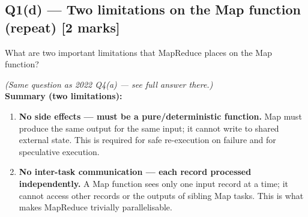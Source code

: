 \documentclass[12pt, a4paper]{article}
\newenvironment{qbox}{\begin{mdframed}[style=qframe]}{\end{mdframed}}
\newenvironment{solbox}{\begin{mdframed}[style=solframe]}{\end{mdframed}}
\newcommand{\qmarks}[1]{\hfill\textbf{\color{orange!70!black}[#1 marks]}}
\begin{document}
\subsection{Q1(d) --- Two limitations on the Map function (repeat)
  \texorpdfstring{\qmarks{2}}{}}
\begin{qbox}What are two important limitations that MapReduce places on the Map function?\end{qbox}
\begin{solbox}
\textit{(Same question as 2022 Q4(a) --- see full answer there.)}\\[4pt]

\textbf{Summary (two limitations):}
\begin{enumerate}[leftmargin=1.6cm, itemsep=4pt]
  \item \textbf{No side effects --- must be a pure/deterministic function.}
    Map must produce the same output for the same input; it cannot write to shared external state.
    This is required for safe re-execution on failure and for speculative execution.
  \item \textbf{No inter-task communication --- each record processed independently.}
    A Map function sees only one input record at a time; it cannot access other records or the
    outputs of sibling Map tasks. This is what makes MapReduce trivially parallelisable.
\end{enumerate}
\end{solbox}

\end{document}
